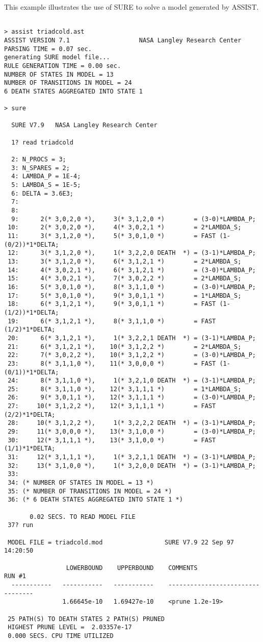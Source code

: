 This example illustrates the use of SURE to solve a model generated
by ASSIST\cite{Johnson-ASSIST-man2}.
\begin{verbatim}

> assist triadcold.ast
ASSIST VERSION 7.1                   NASA Langley Research Center
PARSING TIME = 0.07 sec.
generating SURE model file...
RULE GENERATION TIME = 0.00 sec.
NUMBER OF STATES IN MODEL = 13
NUMBER OF TRANSITIONS IN MODEL = 24
6 DEATH STATES AGGREGATED INTO STATE 1

> sure

  SURE V7.9   NASA Langley Research Center

  1? read triadcold

  2: N_PROCS = 3;
  3: N_SPARES = 2;
  4: LAMBDA_P = 1E-4;
  5: LAMBDA_S = 1E-5;
  6: DELTA = 3.6E3;
  7: 
  8: 
  9:      2(* 3,0,2,0 *),     3(* 3,1,2,0 *)        = (3-0)*LAMBDA_P;
 10:      2(* 3,0,2,0 *),     4(* 3,0,2,1 *)        = 2*LAMBDA_S;
 11:      3(* 3,1,2,0 *),     5(* 3,0,1,0 *)        = FAST (1-(0/2))*1*DELTA;
 12:      3(* 3,1,2,0 *),     1(* 3,2,2,0 DEATH  *) = (3-1)*LAMBDA_P;
 13:      3(* 3,1,2,0 *),     6(* 3,1,2,1 *)        = 2*LAMBDA_S;
 14:      4(* 3,0,2,1 *),     6(* 3,1,2,1 *)        = (3-0)*LAMBDA_P;
 15:      4(* 3,0,2,1 *),     7(* 3,0,2,2 *)        = 2*LAMBDA_S;
 16:      5(* 3,0,1,0 *),     8(* 3,1,1,0 *)        = (3-0)*LAMBDA_P;
 17:      5(* 3,0,1,0 *),     9(* 3,0,1,1 *)        = 1*LAMBDA_S;
 18:      6(* 3,1,2,1 *),     9(* 3,0,1,1 *)        = FAST (1-(1/2))*1*DELTA;
 19:      6(* 3,1,2,1 *),     8(* 3,1,1,0 *)        = FAST (1/2)*1*DELTA;
 20:      6(* 3,1,2,1 *),     1(* 3,2,2,1 DEATH  *) = (3-1)*LAMBDA_P;
 21:      6(* 3,1,2,1 *),    10(* 3,1,2,2 *)        = 2*LAMBDA_S;
 22:      7(* 3,0,2,2 *),    10(* 3,1,2,2 *)        = (3-0)*LAMBDA_P;
 23:      8(* 3,1,1,0 *),    11(* 3,0,0,0 *)        = FAST (1-(0/1))*1*DELTA;
 24:      8(* 3,1,1,0 *),     1(* 3,2,1,0 DEATH  *) = (3-1)*LAMBDA_P;
 25:      8(* 3,1,1,0 *),    12(* 3,1,1,1 *)        = 1*LAMBDA_S;
 26:      9(* 3,0,1,1 *),    12(* 3,1,1,1 *)        = (3-0)*LAMBDA_P;
 27:     10(* 3,1,2,2 *),    12(* 3,1,1,1 *)        = FAST (2/2)*1*DELTA;
 28:     10(* 3,1,2,2 *),     1(* 3,2,2,2 DEATH  *) = (3-1)*LAMBDA_P;
 29:     11(* 3,0,0,0 *),    13(* 3,1,0,0 *)        = (3-0)*LAMBDA_P;
 30:     12(* 3,1,1,1 *),    13(* 3,1,0,0 *)        = FAST (1/1)*1*DELTA;
 31:     12(* 3,1,1,1 *),     1(* 3,2,1,1 DEATH  *) = (3-1)*LAMBDA_P;
 32:     13(* 3,1,0,0 *),     1(* 3,2,0,0 DEATH  *) = (3-1)*LAMBDA_P;
 33: 
 34: (* NUMBER OF STATES IN MODEL = 13 *)
 35: (* NUMBER OF TRANSITIONS IN MODEL = 24 *)
 36: (* 6 DEATH STATES AGGREGATED INTO STATE 1 *)

       0.02 SECS. TO READ MODEL FILE
 37? run

 MODEL FILE = triadcold.mod                 SURE V7.9 22 Sep 97  14:20:50

                 LOWERBOUND    UPPERBOUND    COMMENTS                 RUN #1
  -----------   -----------   -----------    ---------------------------------
                1.66645e-10   1.69427e-10    <prune 1.2e-19>

 25 PATH(S) TO DEATH STATES 2 PATH(S) PRUNED
 HIGHEST PRUNE LEVEL =  2.03357e-17
 0.000 SECS. CPU TIME UTILIZED
\end{verbatim}

